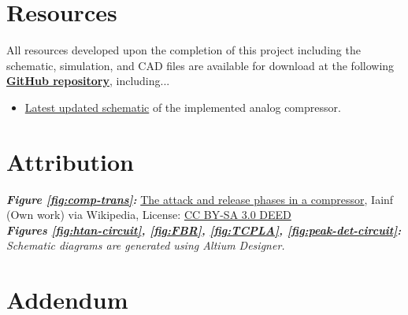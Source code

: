 \documentclass[10pt]{article}
\begin{document}
\begin{multicols*}{2}
        \vspace{15ex}

        \section*{Resources}
            All resources developed upon the completion of this project including the schematic, simulation, and CAD files are available for download at the following \textbf{\textcolor{github-butterfly-bush}{\href{https://github.com/ShaunG-RU/DRC-Project}{GitHub repository}}}, including...
            
            \begin{itemize}
                \item \href{https://github.com/ShaunG-RU/DRC-Project/blob/main/Altium/DRC.pdf}{Latest updated schematic} of the implemented analog compressor.
            \end{itemize}

        \section*{Attribution}
            \footnotesize{
                \textit{\textbf{Figure \ref{fig:comp-trans}:}} \href{https://en.wikipedia.org/wiki/Dynamic_range_compression#/media/File:Audio_Compression_Attack_and_Release-2.svg}{The attack and release phases in a compressor}, Iainf (Own work) via Wikipedia, License: \href{https://creativecommons.org/licenses/by-sa/3.0/}{CC BY-SA 3.0 DEED}\\

                \noindent\textit{\textbf{Figures \ref{fig:htan-circuit}, \ref{fig:FBR}, \ref{fig:TCPLA}, \ref{fig:peak-det-circuit}:} Schematic diagrams are generated using Altium Designer.}\\
            }

        \printbibliography

    \end{multicols*}

    \newpage

    \section*{Addendum}
\end{document}

